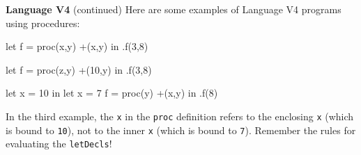 \begin{minipage}[t]{\sw}
\slidenumber
\LARGE
{\bf Language V4} (continued)\exx
Here are some examples of Language V4 programs using procedures:
\large
\begin{qv}
let
  f = proc(x,y) +(x,y)
in
  .f(3,8)

let
  f = proc(z,y) +(10,y)
in
  .f(3,8)

let x = 10
in
  let
    x = 7
    f = proc(y) +(x,y)
  in
    .f(8)
\end{qv}
\LARGE
In the third example, the \verb'x' in the \verb'proc' definition
refers to the enclosing \verb'x' (which is bound to \verb'10'),
not to the inner \verb'x' (which is bound to \verb'7').
Remember the rules for evaluating the \verb'letDecls'!
\end{minipage}
\clearpage
